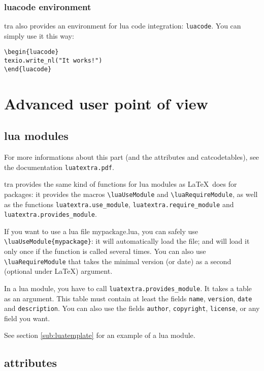 \documentclass{article}
\newcommand\code{\texttt}
\begin{document}
\subsubsection{luacode environment}

\LuaTeX tra also provides an environment for lua code integration:
\code{luacode}. You can simply use it this way:

\begin{verbatim}
\begin{luacode}
texio.write_nl("It works!")
\end{luacode}
\end{verbatim}

\section{Advanced user point of view}

\subsection{lua modules}

For more informations about this part (and the attributes and catcodetables),
see the documentation \code{luatextra.pdf}.

\LuaTeX tra provides the same kind of functions for lua modules as \LaTeX\
does for packages: it provides the macros \verb+\luaUseModule+ and
\verb+\luaRequireModule+, as well as the functions
\code{luatextra.use\_module}, \code{luatextra.require\_module} and
\code{luatextra.provides\_module}.

If you want to use a lua file mypackage.lua, you can safely use
\verb+\luaUseModule{mypackage}+: it will automatically load the
file; and will load it only once if the function is called several times. You
can also use \verb+\luaRequireModule+ that takes the minimal version
(or date) as a second (optional under \LaTeX ) argument.

In a lua module, you have to call \code{luatextra.provides\_module}. It
takes a table as an argument. This table must contain at least the fields
\code{name}, \code{version}, \code{date} and \code{description}. You
can also use the fields \code{author}, \code{copyright}, \code{license},
or any field you want.

See section \ref{sub:luatemplate} for an example of a lua module.

\subsection{attributes}
\end{document}

